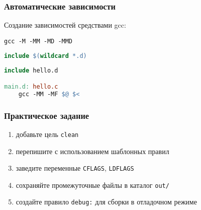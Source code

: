 \begin{frame}[fragile]
	\frametitle{Автоматические зависимости}

	Создание зависимостей средствами gcc:

	\begin{verbatim}
gcc -M -MM -MD -MMD
	\end{verbatim}

	\begin{lstlisting}[language=make]
include $(wildcard *.d)
	\end{lstlisting}

	\begin{lstlisting}[language=make]
include hello.d

main.d: hello.c
	gcc -MM -MF $@ $<
	\end{lstlisting}

\end{frame}
\begin{frame}[fragile]
	\frametitle{Практическое задание}

	\begin{enumerate}
		\item добавьте цель {\tt clean}
		\item перепишите с использованием шаблонных правил
		\item заведите переменные {\tt CFLAGS}, {\tt LDFLAGS}
		\item сохраняйте промежуточные файлы в каталог {\tt out/}
		\item создайте правило {\tt debug:} для сборки в отладочном режиме
	\end{enumerate}
\end{frame}

